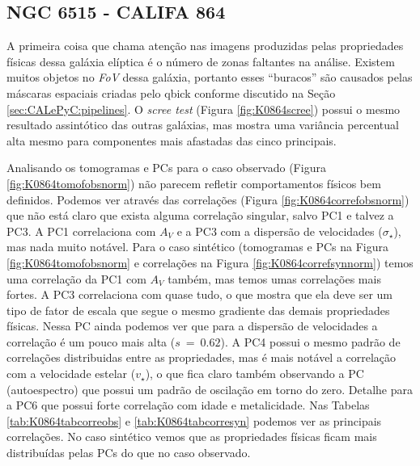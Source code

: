 \subsection{NGC 6515 - CALIFA 864}

A primeira coisa que chama atenção nas imagens produzidas pelas propriedades físicas dessa galáxia elíptica é o número
de zonas faltantes na análise. Existem muitos objetos no {\em FoV} dessa galáxia, portanto esses ``buracos'' são
causados pelas máscaras espaciais criadas pelo {\sc qbick} conforme discutido na Seção \ref{sec:CALePyC:pipelines}. O
{\em scree test} (Figura \ref{fig:K0864scree}) possui o mesmo resultado assintótico das outras galáxias, mas mostra uma
variância percentual alta mesmo para componentes mais afastadas das cinco principais.

Analisando os tomogramas e PCs para o caso observado (Figura \ref{fig:K0864tomofobsnorm}) não parecem refletir
comportamentos físicos bem definidos. Podemos ver através das correlações (Figura \ref{fig:K0864correfobsnorm}) que não
está claro que exista alguma correlação singular, salvo PC1 e talvez a PC3. A PC1 correlaciona com $A_V$ e a PC3 com a
dispersão de velocidades ($\sigma_\star$), mas nada muito notável. Para o caso sintético (tomogramas e PCs na Figura
\ref{fig:K0864tomofobsnorm} e correlações na Figura \ref{fig:K0864correfsynnorm}) temos uma correlação da PC1 com $A_V$
também, mas temos umas correlações mais fortes. A PC3 correlaciona com quase tudo, o que mostra que ela deve ser um tipo
de fator de escala que segue o mesmo gradiente das demais propriedades físicas. Nessa PC ainda podemos ver que para a
dispersão de velocidades a correlação é um pouco mais alta ($s\ =\ 0.62$). A PC4 possui o mesmo padrão de correlações
distribuidas entre as propriedades, mas é mais notável a correlação com a velocidade estelar ($v_\star$), o que fica
claro também observando a PC (autoespectro) que possui um padrão de oscilação em torno do zero. Detalhe para a PC6 que
possui forte correlação com idade e metalicidade. Nas Tabelas \ref{tab:K0864tabcorreobs} e \ref{tab:K0864tabcorresyn}
podemos ver as principais correlações. No caso sintético vemos que as propriedades físicas ficam mais distribuídas pelas
PCs do que no caso observado.

